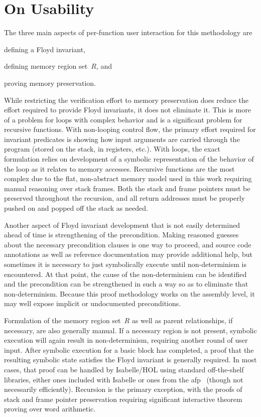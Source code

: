 \section{On Usability}
The three main aspects of per-function user interaction for this methodology are
\begin{enumerate*}
  \item defining a Floyd invariant,
  \item defining memory region set~$R$, and
  \item proving memory preservation.
\end{enumerate*}
While restricting the verification effort to memory preservation
does reduce the effort required to provide Floyd invariants, it does not eliminate it.
This is more of a problem for loops with complex behavior
and is a significant problem for recursive functions.
With non-looping control flow,
the primary effort required for invariant predicates is showing how input arguments
are carried through the program (stored on the stack, in registers, etc.).
With loops, the exact formulation relies on development of a symbolic representation
of the behavior of the loop as it relates to memory accesses.
Recursive functions are the most complex
due to the flat, non-abstract memory model used in this work
requiring manual reasoning over stack frames.
Both the stack and frame pointers must be preserved throughout the recursion,
and all return addresses must be properly pushed on and popped off the stack as needed.

Another aspect of Floyd invariant development
that is not easily determined ahead of time is strengthening of the precondition.
Making reasoned guesses about the necessary precondition clauses is one way to proceed,
and source code annotations as well as reference documentation
may provide additional help,
but sometimes it is necessary to just symbolically execute
until non-determinism is encountered.
At that point, the cause of the non-determinism can be identified
and the precondition can be strengthened in such a way so as to eliminate
that non-determinism.
Because this proof methodology works on the assembly level,
it may well expose implicit or undocumented preconditions.

Formulation of the memory region set~$R$ as well as parent relationships,
if necessary, are also generally manual.
If a necessary region is not present,
symbolic execution will again result in non-determinism,
requiring another round of user input.
After symbolic execution for a basic block has completed,
a proof that the resulting symbolic state satisfies the Floyd invariant
is generally required.
In most cases, that proof can be handled by Isabelle/HOL
using standard off-the-shelf libraries,
either ones included with Isabelle or ones from the \ac{afp}~\citep{afp}
(though not necessarily efficiently).
Recursion is the primary exception,
with the proofs of stack and frame pointer preservation
requiring significant interactive theorem proving over word arithmetic.

